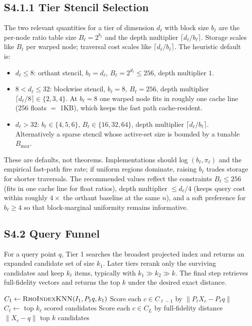 \documentclass[11pt]{article}
\begin{document}
\subsection*{S4.1.1 Tier Stencil Selection}
The two relevant quantities for a tier of dimension $d_\ell$ with block size $b_\ell$ are the per-node ratio table size $B_\ell=2^{b_\ell}$ and the depth multiplier $\lceil d_\ell/b_\ell\rceil$. Storage scales like $B_\ell$ per warped node; traversal cost scales like $\lceil d_\ell/b_\ell\rceil$. The heuristic default is:
\begin{itemize}[leftmargin=1.5em]
    \item $d_\ell\leq 8$: orthant stencil, $b_\ell=d_\ell$, $B_\ell=2^{d_\ell}\leq 256$, depth multiplier $1$.
    \item $8<d_\ell\leq 32$: blockwise stencil, $b_\ell=8$, $B_\ell=256$, depth multiplier $\lceil d_\ell/8\rceil\in\{2,3,4\}$. At $b_\ell=8$ one warped node fits in roughly one cache line (256 floats $=$ 1KB), which keeps the fast path cache-resident.
    \item $d_\ell>32$: $b_\ell\in\{4,5,6\}$, $B_\ell\in\{16,32,64\}$, depth multiplier $\lceil d_\ell/b_\ell\rceil$. Alternatively a sparse stencil whose active-set size is bounded by a tunable $B_{\max}$.
\end{itemize}
These are defaults, not theorems. Implementations should log $(b_\ell,\pi_\ell)$ and the empirical fast-path fire rate; if uniform regions dominate, raising $b_\ell$ trades storage for shorter traversals. The recommended values reflect the constraints $B_\ell\leq 256$ (fits in one cache line for float ratios), depth multiplier $\leq d_\ell/4$ (keeps query cost within roughly $4\times$ the orthant baseline at the same $n$), and a soft preference for $b_\ell\geq 4$ so that block-marginal uniformity remains informative.

\subsection*{S4.2 Query Funnel}
For a query point $q$, Tier 1 searches the broadest projected index and returns an expanded candidate set of size $k_1$. Later tiers rerank only the surviving candidates and keep $k_\ell$ items, typically with $k_1\gg k_2\gg k$. The final step retrieves full-fidelity vectors and returns the top $k$ under the desired exact distance.

\begin{algorithm}[t]
\caption{\textsc{CascadeQuery}: SI-level cascade specification}
\label{alg:si-cascade-query}
\begin{algorithmic}[1]
    \State $C_1\gets \Call{RhoIndexKNN}{I_1,P_1q,k_1}$
        \State Score each $c\in C_{\ell-1}$ by $\|P_\ell X_c-P_\ell q\|$
        \State $C_\ell\gets$ top $k_\ell$ scored candidates
    \EndFor
    \State Score each $c\in C_L$ by full-fidelity distance $\|X_c-q\|$
    \State \Return top $k$ candidates
\EndProcedure
\end{algorithmic}
\end{algorithm}
\end{document}

